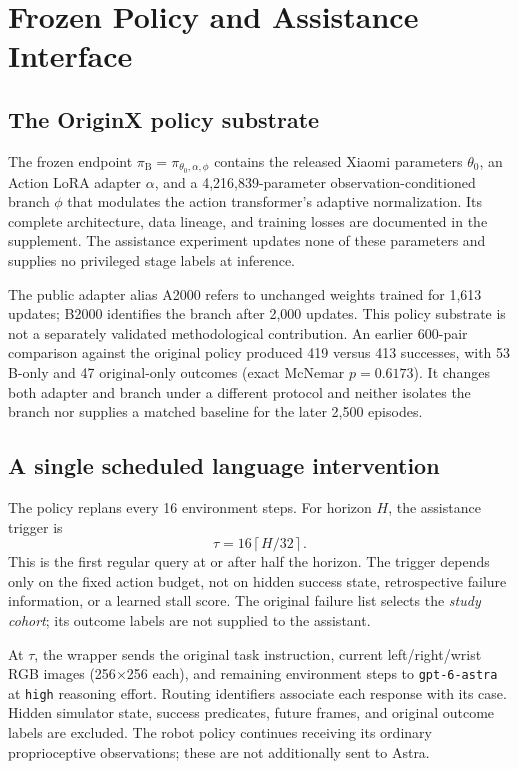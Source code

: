 \documentclass[10pt,twocolumn,letterpaper]{article}
\newcommand{\policy}{\pi_{\mathrm B}}
\begin{document}
\section{Frozen Policy and Assistance Interface}
\label{sec:method}
\subsection{The OriginX policy substrate}
The frozen endpoint $\policy=\pi_{\theta_0,\alpha,\phi}$ contains the released Xiaomi parameters $\theta_0$, an Action LoRA adapter $\alpha$, and a 4,216,839-parameter observation-conditioned branch $\phi$ that modulates the action transformer's adaptive normalization. Its complete architecture, data lineage, and training losses are documented in the supplement. The assistance experiment updates none of these parameters and supplies no privileged stage labels at inference.

The public adapter alias A2000 refers to unchanged weights trained for 1,613 updates; B2000 identifies the branch after 2,000 updates. This policy substrate is not a separately validated methodological contribution. An earlier 600-pair comparison against the original policy produced 419 versus 413 successes, with 53 B-only and 47 original-only outcomes (exact McNemar $p=0.6173$). It changes both adapter and branch under a different protocol and neither isolates the branch nor supplies a matched baseline for the later 2,500 episodes.

\subsection{A single scheduled language intervention}
The policy replans every 16 environment steps. For horizon $H$, the assistance trigger is
\begin{equation}
\tau=16\left\lceil H/32\right\rceil.
\label{eq:trigger}
\end{equation}
This is the first regular query at or after half the horizon. The trigger depends only on the fixed action budget, not on hidden success state, retrospective failure information, or a learned stall score. The original failure list selects the \emph{study cohort}; its outcome labels are not supplied to the assistant.

At $\tau$, the wrapper sends the original task instruction, current left/right/wrist RGB images (256$\times$256 each), and remaining environment steps to \texttt{gpt-6-astra} at \texttt{high} reasoning effort. Routing identifiers associate each response with its case. Hidden simulator state, success predicates, future frames, and original outcome labels are excluded. The robot policy continues receiving its ordinary proprioceptive observations; these are not additionally sent to Astra.
\end{document}

